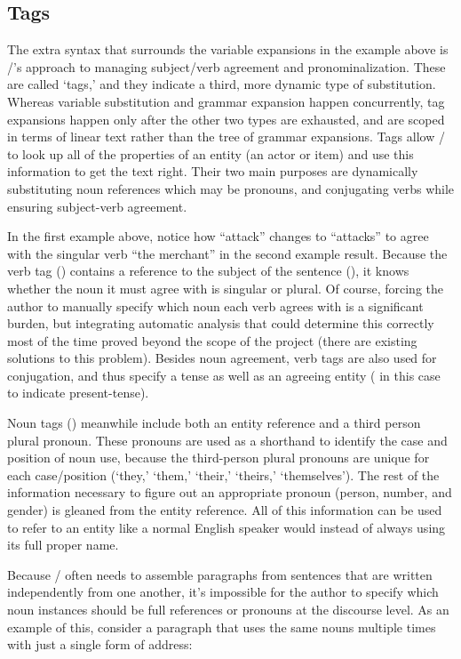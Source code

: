 \subsection{Tags}

The extra syntax that surrounds the variable expansions in the  example above is \dunyazad/'s approach to managing subject/verb agreement and pronominalization.
%
These are called `tags,' and they indicate a third, more dynamic type of substitution.
%
Whereas variable substitution and grammar expansion happen concurrently, tag expansions happen only after the other two types are exhausted, and are scoped in terms of linear text rather than the tree of grammar expansions.
%
Tags allow \dunyazad/ to look up all of the properties of an entity (an actor or item) and use this information to get the text right.
%
Their two main purposes are dynamically substituting noun references which may be pronouns, and conjugating verbs while ensuring subject-verb agreement.


In the first example above, notice how ``attack'' changes to ``attacks'' to agree with the singular verb ``the merchant'' in the second example result.
%
Because the verb tag () contains a reference to the subject of the sentence (), it knows whether the noun it must agree with is singular or plural.
%
Of course, forcing the author to manually specify which noun each verb agrees with is a significant burden, but integrating automatic analysis that could determine this correctly most of the time proved beyond the scope of the project (there are existing solutions to this problem).
%
Besides noun agreement, verb tags are also used for conjugation, and thus specify a tense as well as an agreeing entity ( in this case to indicate present-tense).


Noun tags () meanwhile include both an entity reference and a third person plural pronoun.
%
These pronouns are used as a shorthand to identify the case and position of noun use, because the third-person plural pronouns are unique for each case/position (`they,' `them,' `their,' `theirs,' `themselves').
%
The rest of the information necessary to figure out an appropriate pronoun (person, number, and gender) is gleaned from the entity reference.
%
All of this information can be used to refer to an entity like a normal English speaker would instead of always using its full proper name.


Because \dunyazad/ often needs to assemble paragraphs from sentences that are written independently from one another, it's impossible for the author to specify which noun instances should be full references or pronouns at the discourse level.
%
As an example of this, consider a paragraph that uses the same nouns multiple times with just a single form of address:

